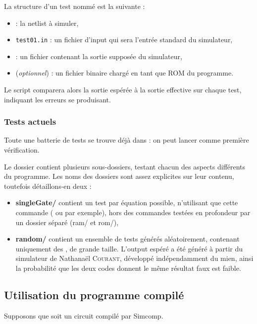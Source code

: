 \documentclass[11pt,a4paper]{article}
\begin{document}
La structure d'un test nommé  est la suivante :
\begin{itemize}
\item {} : la netlist à simuler,
\item \lstinline`test01.in` : un fichier d'input qui sera l'entrée standard du simulateur,
\item {} : un fichier contenant la sortie supposée du simulateur,
\item {} (\emph{optionnel}) : un fichier binaire chargé en tant que ROM du programme.
\end{itemize}

Le script comparera alors la sortie espérée à la sortie effective sur chaque test, indiquant les erreurs se produisant.

\subsubsection*{Tests actuels}

Toute une batterie de tests se trouve déjà dans  : on peut lancer  comme première vérification.

Le dossier  contient plusieurs sous-dossiers, testant chacun des aspects différents du programme. Les noms des dossiers sont assez explicites sur leur contenu, toutefois détaillons-en deux :

\begin{itemize}
\item \textbf{singleGate/} contient un test par équation possible, n'utilisant que cette commande ( ou  par exemple), hors des commandes testées en profondeur par un dossier séparé (ram/ et rom/),
\item \textbf{random/} contient un ensemble de tests générés aléatoirement, contenant uniquement des , de grande taille. L'output espéré a été généré à partir du simulateur de Nathanaël \textsc{Courant}, développé indépendamment du mien, ainsi la probabilité que les deux codes donnent le même résultat faux est faible.
\end{itemize}


\subsection{Utilisation du programme compilé} \label{sec:i/o}

Supposons que  soit un circuit compilé par Simcomp.
\end{document}
